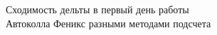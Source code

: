 \documentclass[aspectratio=169]{beamer}
\begin{document}
  \begin{frame}{Сходимость дельты в первый день работы \\ Автоколла Феникс разными методами подсчета}
\begin{figure}[h!]
\begin{minipage}[h!]{0.49\linewidth}
\end{minipage}
\hfill
\begin{minipage}[h!]{0.49\linewidth}
\end{minipage}

\label{ris:image1}
\end{figure}
 \end{frame} 

 
\end{document}
